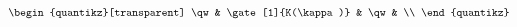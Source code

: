 \documentclass[10pt]{article}
\begin{document}
\[\begin{quantikz}[transparent]
    \qw &     \gate[1]{K(\kappa)}    & \qw & \\
\end{quantikz}
\]
\end{document}
